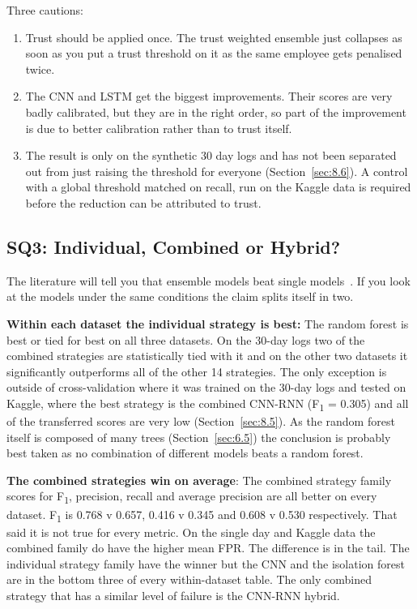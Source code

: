\documentclass[a4paper,12pt]{article}
\begin{document}
Three cautions:

\begin{enumerate}
  \item Trust should be applied once. The trust weighted ensemble just collapses as soon as you put a trust threshold on it as the same employee gets penalised twice.
  \item The CNN and LSTM get the biggest improvements. Their scores are very badly calibrated, but they are in the right order, so part of the improvement is due to better calibration rather than to trust itself.
  \item The result is only on the synthetic 30 day logs and has not been separated out from just raising the threshold for everyone (Section~\ref{sec:8.6}). A control with a global threshold matched on recall, run on the Kaggle data is required before the reduction can be attributed to trust.
\end{enumerate}
\subsection{SQ3: Individual, Combined or Hybrid?}
\label{sec:9.3}

The literature will tell you that ensemble models beat single models~\cite{alzaabi2024}. If you look at the models under the same conditions the claim splits itself in two.

\textbf{Within each dataset the individual strategy is best:} The random forest is best or tied for best on all three datasets. On the 30-day logs two of the combined strategies are statistically tied with it and on the other two datasets it significantly outperforms all of the other 14 strategies. The only exception is outside of cross-validation where it was trained on the 30-day logs and tested on Kaggle, where the best strategy is the combined CNN-RNN (F\textsubscript{1} = 0.305) and all of the transferred scores are very low (Section~\ref{sec:8.5}). As the random forest itself is composed of many trees (Section~\ref{sec:6.5}) the conclusion is probably best taken as no combination of different models beats a random forest.

\textbf{The combined strategies win on average}: The combined strategy family scores for F\textsubscript{1}, precision, recall and average precision are all better on every dataset. F\textsubscript{1} is 0.768 v 0.657, 0.416 v 0.345 and 0.608 v 0.530 respectively. That said it is not true for every metric. On the single day and Kaggle data the combined family do have the higher mean FPR. The difference is in the tail. The individual strategy family have the winner but the CNN and the isolation forest are in the bottom three of every within-dataset table. The only combined strategy that has a similar level of failure is the CNN-RNN hybrid.
\end{document}
